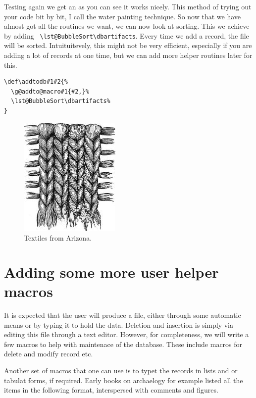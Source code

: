 \documentclass[imperial, justified]{octavo}
\begin{document}
Testing again we get \texttt{\dbartifacts} an as you can see it works nicely. This method of trying out your code bit by bit, I call the water painting technique. So now that we have almost got all the routines we want, we can now look at sorting. This we achieve by adding \verb+ \lst@BubbleSort\dbartifacts+. Every time we add a record, the file will be sorted. Intuituitevely, this might not  be very efficient, especially if you are adding a lot of records at one time, but we can add more helper routines later for this.

\begin{verbatim}
\def\addtodb#1#2{%
  \g@addto@macro#1{#2,}%
  \lst@BubbleSort\dbartifacts%
}
\end{verbatim}

\def\figurename{\textbf{Figure}}
\begin{figure}
\vspace*{1cm}
\centering
\includegraphics[scale=0.6]{./images/fig172}
\caption{Textiles from Arizona. }
\end{figure}

\section{Adding some more user helper macros}

It is expected that the user will produce a file, either through some automatic means or by typing it to hold the data. Deletion and insertion is simply via editing this file through a text editor. However, for completeness, we will write a few macros to help with maintenace of the database. These include macros for delete and modify record etc.

Another set of macros that one can use is to typet the records in lists and or tabulat forms, if required. Early books on archaelogy for example listed all the items in the following format, interspersed with comments and figures.
\smallskip
\end{document}
